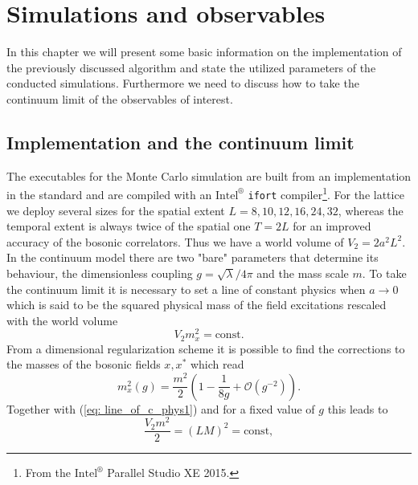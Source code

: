 \chapter{Simulations and observables}\label{ch: parameters}
In this chapter we will present some basic information on the implementation of the previously discussed algorithm and state the utilized parameters of the conducted simulations. Furthermore we need to discuss how to take the continuum limit of the observables of interest.
%
%
%
%
%
%
\section{Implementation and the continuum limit}
The executables for the Monte Carlo simulation are built from an implementation in the  standard and are compiled with an $\text{Intel}^{\circledR}$ \texttt{ifort} compiler\footnote{From the $\text{Intel}^{\circledR}$ Parallel Studio XE 2015.}. For the lattice we deploy several sizes for the spatial extent $L=8,10,12,16,24,32$, whereas the temporal extent is always twice of the spatial one $T=2L$ for an improved accuracy of the bosonic correlators. Thus we have a world volume of $V_{2}=2a^{2}L^{2}$. In the continuum model there are two "bare" parameters that determine its behaviour, the dimensionless coupling $g=\sqrt{\lambda}/4\pi$ and the mass scale $m$. To take the continuum limit it is necessary to set a line of constant physics when $a \to 0$ which is said to be the squared physical mass of the field excitations rescaled with the world volume
%
%
\begin{equation}
V_{2}m_{x}^{2} = \text{const}.
\label{eq: line_of_c_phys1}
\end{equation}
%
%
From a dimensional regularization scheme it is possible to find the corrections to the masses of the bosonic fields $x,x^{*}$ which read \cite{Giombi:2010bj}
%
%
\begin{equation}
m_{x}^{2}(g) = \frac{m^{2}}{2}\left(1 - \frac{1}{8g} + \mathcal{O}(g^{-2}) \right).
\label{eq: m_x}
\end{equation}
%
%
Together with (\ref{eq: line_of_c_phys1}) and for a fixed value of $g$ this leads to 
%
%
\begin{equation}
\frac{V_{2}m^{2}}{2} = (LM)^{2} = \text{const},
\label{eq: line_of_c_phys2}
\end{equation}
%
%

